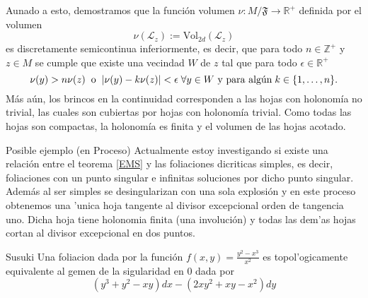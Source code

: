 \documentclass[letterpaper]{beamer}
\newcommand{\zah}{\ensuremath{ \mathbb Z }}
\newcommand{\re}{\ensuremath{\mathbb R }}
\begin{document}
\begin{frame}
Aunado a esto, demostramos que la funci\'on volumen $\nu:M/\mathfrak{F}\rightarrow\re^{+}$ definida por el volumen
\[
        \nu(\mathcal{L}_z):=\textrm{Vol}_{2d}(\mathcal{L}_z)
\]
es discretamente semicontinua inferiormente, es decir, que para todo $n\in\zah^{+}$ y $z\in M$ se cumple que existe una vecindad $W$ de $z$
tal que para todo $\epsilon\in\re^{+}$
\[
        \nu(y)>n\nu(z)\hspace{0.2cm}\text{o}\hspace{0.2cm}|\nu(y)-k\nu(z)|<\epsilon\hspace{0.1cm}\forall y\in W\text{ y para alg\'un}\hspace{0.1cm}k\in\{1,\dots,n\}.
\]
\noindent M\'as a\'un, los brincos en la continuidad corresponden a las hojas con holonom\'ia no trivial, las cuales son cubiertas
por hojas con holonom\'ia trivial. Como todas las hojas son compactas, la holonom\'ia es finita y el volumen de las hojas acotado.
\end{frame}
\begin{frame}
  \begin{block}{Posible ejemplo (en Proceso)}
    Actualmente estoy investigando si existe una relación entre el teorema \ref{EMS} y las foliaciones dicriticas simples, es decir, foliaciones con un punto
    singular e infinitas soluciones por dicho punto singular. Adem\'as al ser simples se desingularizan con una sola explosi\'on y en este proceso obtenemos una
    'unica hoja tangente al divisor excepcional orden de tangencia uno. Dicha hoja tiene holonomia finita (una involuci\'on) y todas las dem'as hojas cortan  al  divisor excepcional en dos puntos.
  \end{block}
\end{frame}
\begin{frame}
\begin{block}{Susuki}
  Una foliacion dada por la funci\'on $f(x,y)=\frac{y^{2}-x^{3}}{x^{2}}$ es topol'ogicamente equivalente al gemen
  de la sigularidad en $0$ dada por
    \[
        (y^{3}+y^{2}-xy)dx-(2xy^{2}+xy-x^{2})dy
      \]
      {
      \centering
      
      \par
    }
    \end{block}
\end{frame}
\end{document}
